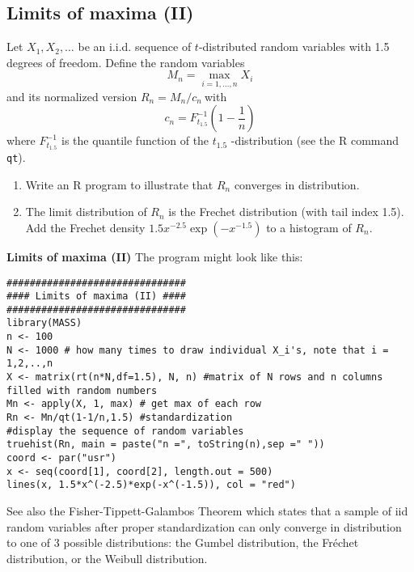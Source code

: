 \documentclass{article}
\begin{document}
\subsection{Limits of maxima (II)}

Let $X_{1},X_{2},\ldots $ be an i.i.d. sequence of $t$-distributed random
variables with 1.5 degrees of freedom. Define the random variables%
\begin{equation*}
M_{n}=\max_{i=1,\ldots ,n}X_{i}
\end{equation*}%
and its normalized version $R_{n}=M_{n}/c_{n}\ $with
\begin{equation*}
c_{n}=F_{t_{1.5}}^{-1}\left( 1-\frac{1}{n}\right)
\end{equation*}%
where $F_{t_{1.5}}^{-1}$ is the quantile function of the $t_{1.5}$%
-distribution (see the R command \texttt{qt}).

\begin{enumerate}
\item Write an R program to illustrate that $R_{n}$ converges in
distribution.

\item The limit distribution of $R_{n}$ is the Frechet distribution (with
tail index 1.5). Add the Frechet density $1.5x^{-2.5}\exp \left(
-x^{-1.5}\right) $ to a histogram of $R_{n}$.
\end{enumerate}

\begin{solution}
\textbf{Limits of maxima (II)}
The program might look like this:
\begin{verbatim}
###############################
#### Limits of maxima (II) ####
###############################
library(MASS)
n <- 100
N <- 1000 # how many times to draw individual X_i's, note that i = 1,2,..,n
X <- matrix(rt(n*N,df=1.5), N, n) #matrix of N rows and n columns filled with random numbers
Mn <- apply(X, 1, max) # get max of each row
Rn <- Mn/qt(1-1/n,1.5) #standardization
#display the sequence of random variables
truehist(Rn, main = paste("n =", toString(n),sep =" "))
coord <- par("usr")
x <- seq(coord[1], coord[2], length.out = 500)
lines(x, 1.5*x^(-2.5)*exp(-x^(-1.5)), col = "red")
\end{verbatim}
See also the Fisher-Tippett-Galambos Theorem which states that a sample of iid random variables after proper standardization can only converge in distribution to one of 3 possible distributions: the Gumbel distribution, the Fréchet distribution, or the Weibull distribution.
\end{solution}
\end{document}
